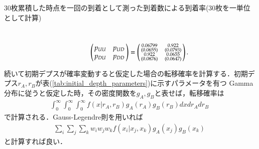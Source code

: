 \documentclass[a4j,papersize,disablejfam,slide,14pt]{jsarticle}
\begin{document}
\begin{description}
        \item[$30$枚累積した時点を一回の到着として測った到着数による到着率(30枚を一単位として計算)]\mbox{}\\
        	\begin{align}
    			\left(
    			\begin{array}{@{\,}cc@{\,}}
    				p_{UU} & p_{UD} \\
            		p_{DU} & p_{DD}
    			\end{array}
    			\right)
                = \left(
    			\begin{array}{@{\,}cc@{\,}}
    				\substack{0.06799 \\ (0.0655)} & \substack{0.922 \\ (0.0793)} \\
            		\substack{0.922 \\ (0.0876)} & \substack{0.0655 \\ (0.0647)}
    			\end{array}
    			\right).
    		\end{align}
    \end{description}
    
    続いて初期デプスが確率変動すると仮定した場合の転移確率を計算する．初期デプス$r_A, r_B$が表(\ref{tab:initial_depth_parameters})に示すパラメータを有つ
    {\rm Gamma}分布に従うと仮定した時，その密度関数を$g_A, g_B$と表せば，転移確率は
    \begin{align}
    	\int_{0}^{\infty}\int_{0}^{\infty}\int_{0}^{\infty} f(x|r_A,r_B) g_A(r_A) g_B(r_B) dx dr_A dr_B
    \end{align}
    で計算される．{\rm Gauss-Legendre}則を用いれば
    \begin{align}
    	\sum_{i} \sum_{j} \sum_{k} w_i w_j w_k f(x_i|x_j, x_k) g_A(x_j) g_B(x_k)
    \end{align}
    と計算すれば良い．
    \mbox{}\\
    
\end{document}
